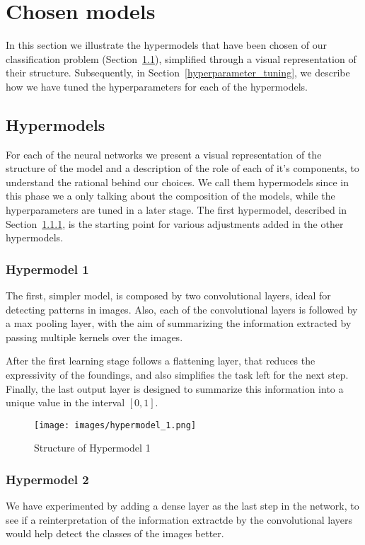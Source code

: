 \section{Chosen models}\label{2_models}
In this section we illustrate the hypermodels that have been chosen of our classification problem (Section~\ref{hypermodels}), simplified through a visual representation of their structure. Subsequently, in Section~\ref{hyperparameter_tuning}, we describe how we have tuned the hyperparameters for each of the hypermodels.

\subsection{Hypermodels}\label{hypermodels}
For each of the neural networks we present a visual representation of the structure of the model and a description of the role of each of it's components, to understand the rational behind our choices. We call them hypermodels since in this phase we a only talking about the composition of the models, while the hyperparameters are tuned in a later stage. The first hypermodel, described in Section~\ref{hypermodel_1}, is the starting point for various adjustments added in the other hypermodels.

\subsubsection{Hypermodel 1}\label{hypermodel_1}
The first, simpler model, is composed by two convolutional layers, ideal for detecting patterns in images. Also, each of the convolutional layers is followed by a max pooling layer, with the aim of summarizing the information extracted by passing multiple kernels over the images.

After the first learning stage follows a flattening layer, that reduces the expressivity of the foundings, and also simplifies the task left for the next step. Finally, the last output layer is designed to summarize this information into a unique value in the interval $\left[0,1\right]$.

\begin{figure}[h]
    \label{fig:Hypermodel_1}
    \centering
    \texttt{[image: images/hypermodel\_1.png]}
    \caption{Structure of Hypermodel 1}
\end{figure}

\subsubsection{Hypermodel 2}\label{hypermodel_2}
We have experimented by adding a dense layer as the last step in the network, to see if a reinterpretation of the information extractde by the convolutional layers would help detect the classes of the images better.

